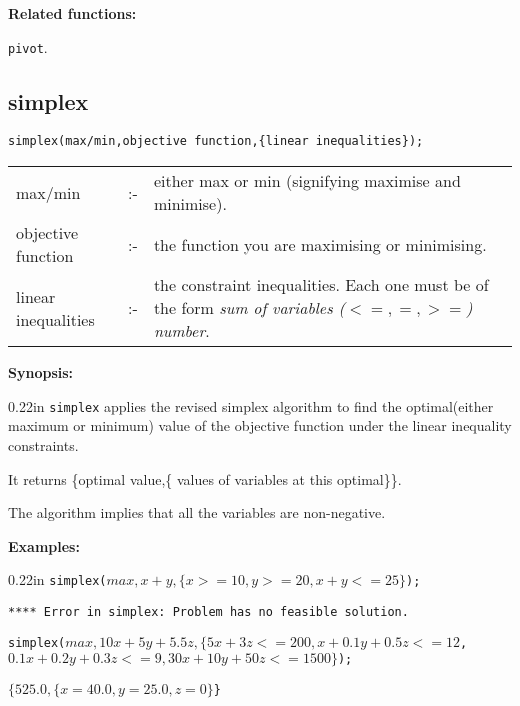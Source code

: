 {\bf Related functions:}

\hspace*{0.175in} {\tt pivot}.


\subsection{simplex}


\hspace*{0.175in} {\tt simplex(max/min,objective function,\{linear 
inequalities\});}

\hspace*{0.1in}  
\begin{tabular}{l l l} 
max/min             & :- & \parbox[t]{.63\linewidth}{either max or min 
                           (signifying maximise and minimise).} \\
objective function  & :- & the function you are maximising or 
                           minimising. \\
linear inequalities & :- & \parbox[t]{.63\linewidth}{the constraint 
                           inequalities. Each one must be of the form 
                           {\it sum of variables ($<=,=,>=$) number}.}
\end{tabular}

{\bf Synopsis:} %

\begin{addtolength}{\leftskip}{0.22in}
{\tt simplex} applies the revised simplex algorithm to find the 
optimal(either maximum or minimum) value of the objective function 
under the linear inequality constraints.

It returns \{optimal value,\{ values of variables at this optimal\}\}.

The algorithm implies that all the variables are non-negative.

\end{addtolength}

{\bf Examples:}

\begin{addtolength}{\leftskip}{0.22in}
{\tt simplex($max,x+y,\{x>=10,y>=20,x+y<=25\}$);}

{\tt ***** Error in simplex: Problem has no feasible solution.}

\vspace*{0.2in}

\parbox[t]{0.96\linewidth}{\tt simplex($max,10x+5y+5.5z,\{5x+3z<=200,
x+0.1y+0.5z<=12$,\\
\hspace*{0.55in} $0.1x+0.2y+0.3z<=9, 30x+10y+50z<=1500\}$);}

\vspace*{0.1in}
{\tt $\{525.0,\{x=40.0,y=25.0,z=0\}$\}}

\end{addtolength}


